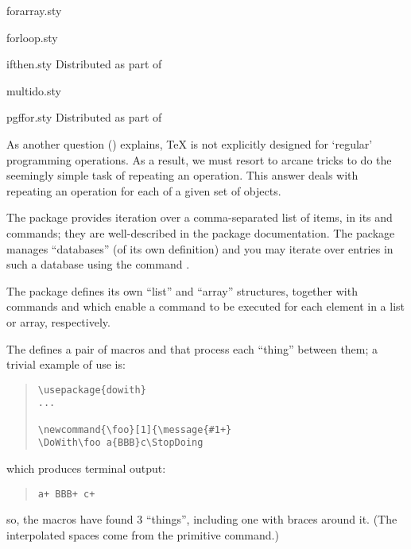 %
\begin{ctanrefs}
\item[forarray.sty]
\item[forloop.sty]
\item[ifthen.sty]Distributed as part of 
\item[multido.sty]
\item[pgffor.sty]Distributed as part of 
\end{ctanrefs}


As another question %
()
explains, \TeX{} is not explicitly designed for `regular' programming
operations. As a result, we must resort to arcane tricks to do the
seemingly simple task of repeating an operation.  This answer deals
with repeating an operation for each of a given set of objects.

The  package provides iteration over a
comma-separated list of items, in its  and
 commands; they are well-described in the package
documentation.  The  package manages ``databases''
(of its own definition) and you may iterate over entries in such a
database using the command .

The  package defines its own ``list'' and ``array''
structures, together with commands  and 
which enable a command to be executed for each element in a list or
array, respectively.

The  defines a pair of macros  and
 that process each ``thing'' between them; a trivial
example of use is:
\begin{quote}
\begin{verbatim}
\usepackage{dowith}
...

\newcommand{\foo}[1]{\message{#1+}
\DoWith\foo a{BBB}c\StopDoing
\end{verbatim}
\end{quote}
which produces terminal output:
\begin{quote}
\begin{verbatim}
a+ BBB+ c+
\end{verbatim}
\end{quote}
so, the macros have found 3 ``things'', including one with braces
around it.  (The interpolated spaces come from the primitive
 command.)

